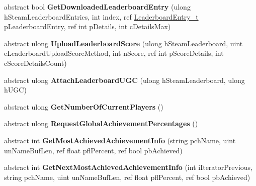 \begin{DoxyCompactItemize}
\item 
\mbox{\label{class_valve_1_1_steamworks_1_1_i_steam_user_stats_a12525701d48c9dbb6ad9ce1506812029}} 
abstract bool {\bfseries Get\+Downloaded\+Leaderboard\+Entry} (ulong h\+Steam\+Leaderboard\+Entries, int index, ref \hyperlink{struct_valve_1_1_steamworks_1_1_leaderboard_entry__t}{Leaderboard\+Entry\+\_\+t} p\+Leaderboard\+Entry, ref int p\+Details, int c\+Details\+Max)
\item 
\mbox{\label{class_valve_1_1_steamworks_1_1_i_steam_user_stats_a56683d4b3bd94ac504be596a0aa9f53d}} 
abstract ulong {\bfseries Upload\+Leaderboard\+Score} (ulong h\+Steam\+Leaderboard, uint e\+Leaderboard\+Upload\+Score\+Method, int n\+Score, ref int p\+Score\+Details, int c\+Score\+Details\+Count)
\item 
\mbox{\label{class_valve_1_1_steamworks_1_1_i_steam_user_stats_a4dd6c69ecd1938012d5c4212449a1a43}} 
abstract ulong {\bfseries Attach\+Leaderboard\+U\+GC} (ulong h\+Steam\+Leaderboard, ulong h\+U\+GC)
\item 
\mbox{\label{class_valve_1_1_steamworks_1_1_i_steam_user_stats_aa8991a0350ab3df42a64a93c19858a4c}} 
abstract ulong {\bfseries Get\+Number\+Of\+Current\+Players} ()
\item 
\mbox{\label{class_valve_1_1_steamworks_1_1_i_steam_user_stats_a396c8e2e69d2479f702a8a9b222a9d57}} 
abstract ulong {\bfseries Request\+Global\+Achievement\+Percentages} ()
\item 
\mbox{\label{class_valve_1_1_steamworks_1_1_i_steam_user_stats_adff9e5741c86a450a89ba9b7476c2410}} 
abstract int {\bfseries Get\+Most\+Achieved\+Achievement\+Info} (string pch\+Name, uint un\+Name\+Buf\+Len, ref float pfl\+Percent, ref bool pb\+Achieved)
\item 
\mbox{\label{class_valve_1_1_steamworks_1_1_i_steam_user_stats_ae542684ef06d0d377736624596157659}} 
abstract int {\bfseries Get\+Next\+Most\+Achieved\+Achievement\+Info} (int i\+Iterator\+Previous, string pch\+Name, uint un\+Name\+Buf\+Len, ref float pfl\+Percent, ref bool pb\+Achieved)

\end{DoxyCompactItemize}
